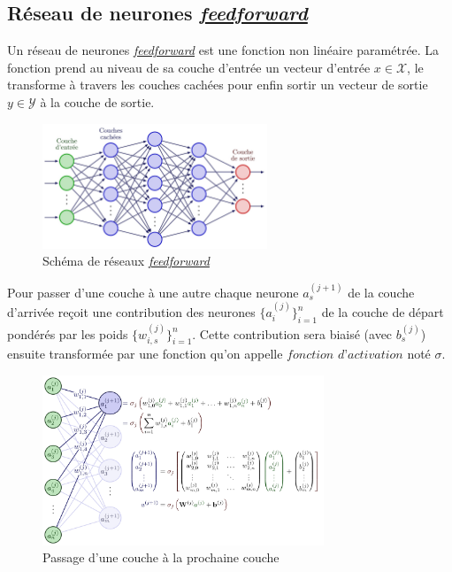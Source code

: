 \documentclass[french,12pt]{article}
\let\oldsubsection\subsection%
\renewcommand{\subsection}{%
  \renewcommand{\theequation}{\thesubsection.\arabic{equation}}%
  \oldsubsection}%
\begin{document}
\subsection{Réseau de neurones \href{https://en.wikipedia.org/wiki/Feedforward_neural_network}{\textit{feedforward}}}

Un réseau de neurones \href{https://en.wikipedia.org/wiki/Feedforward_neural_network}{\textit{feedforward}} est une fonction non linéaire paramétrée.
La fonction prend au niveau de sa couche d'entrée un vecteur d'entrée $x \in \mathcal{X}$, le transforme
à travers les couches cachées pour enfin sortir un vecteur de sortie $y \in \mathcal{Y}$ à la couche de sortie.

\begin{figure}[H]
    \centerline{\includegraphics[width = 0.6\textwidth]{FNN/Images/fnn/fnn_page-0001.jpg}}
    \caption{Schéma de réseaux \href{https://en.wikipedia.org/wiki/Feedforward_neural_network}{\textit{feedforward}} \cite{NeetGraph}}
    \label{fig:fnn}
\end{figure}

Pour passer d'une couche à une autre chaque neurone $a^{(j + 1)}_s$ de la couche d'arrivée reçoit une contribution
des neurones $\{a^{(j)}_i\}_{i = 1}^n$ de la couche de départ pondérés par les poids
$\{w^{(j)}_{i,s}\}_{i = 1}^n$. Cette contribution sera biaisé (avec $b^{(j)}_s$) ensuite transformée par une fonction
qu'on appelle $\textit{fonction d'activation}$ noté $\sigma$.

\begin{figure}[H]
    \centerline{\includegraphics[width = 0.75\textwidth]{FNN/Images/fnnDetails/fnnDetails_page-0001.jpg}}
    \caption{Passage d'une couche à la prochaine couche \cite{NeetGraph}}
    \label{fig:fnnDetails}
\end{figure}
\end{document}
